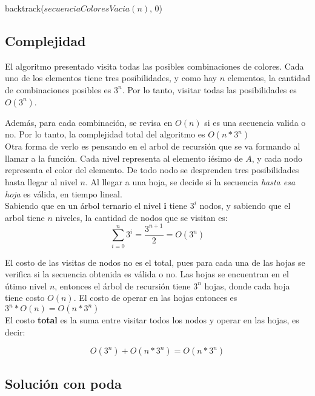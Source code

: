 \begin{algorithm}[H]
\begin{algorithmic}
  \State backtrack($secuenciaColoresVacia(n)$, $0$)
\EndProcedure
\end{algorithmic}
\end{algorithm}


\subsection{Complejidad}

El algoritmo presentado visita todas las posibles combinaciones de colores. Cada uno de los elementos tiene tres posibilidades, y como hay $n$ elementos, la cantidad de combinaciones posibles es $3^{n}$. Por lo tanto, visitar todas las posibilidades es $O(3^{n})$.

Además, para cada combinación, se revisa en $O(n)$ si es una secuencia valida o no. Por lo tanto, la complejidad total del algoritmo es $O(n * 3^{n})$ \\

Otra forma de verlo es pensando en el arbol de recursión que se va formando al llamar a la función. Cada nivel representa al elemento iésimo de $A$, y cada nodo representa el color del elemento. De todo nodo se desprenden tres posibilidades hasta llegar al nivel $n$. Al llegar a una hoja, se decide si la secuencia \textit{hasta esa hoja} es válida, en tiempo lineal. \\

Sabiendo que en un árbol ternario el nivel \textbf{i} tiene $3^{i}$ nodos, y sabiendo que el arbol tiene $n$ niveles, la cantidad de nodos que se visitan es: \\

$$\sum_{i = 0}^{n} 3^{i} = \frac{3^{n+1}}{2} = O(3^n)$$

El costo de las visitas de nodos no es el total, pues para cada una de las hojas se verifica si la secuencia obtenida es válida o no. Las hojas se encuentran en el útimo nivel $n$, entonces el árbol de recursión tiene $3^n$ hojas, donde cada hoja tiene costo $O(n)$. El costo de operar en las hojas entonces es $3^n * O(n) = O(n * 3^n)$ \\

El costo \textbf{total} es la suma entre visitar todos los nodos y operar en las hojas, es decir:

$$O(3^n) + O(n * 3^n) = O(n * 3^n) $$


\subsection{Solución con poda}

